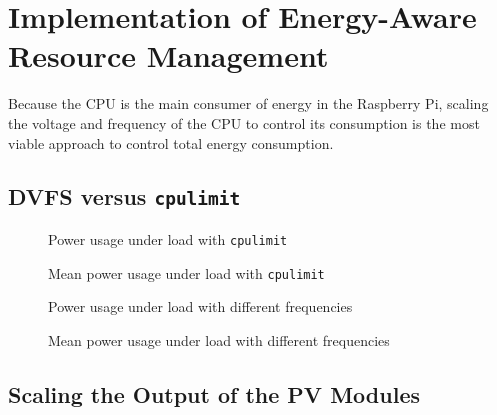 \section{Implementation of Energy-Aware Resource Management}
\label{sec:implementation_of_energy-aware_resource_management}

Because the CPU is the main consumer of energy in the Raspberry Pi, scaling the
voltage and frequency of the CPU to control its consumption is the most viable
approach to control total energy consumption.

\subsection{DVFS versus \texttt{cpulimit}}

\begin{figure}
    \centering
    
    \caption{Power usage under load with \texttt{cpulimit}}
    \label{fig:cpulimit_load}
\end{figure}

\begin{figure}
    \centering
    
    \caption{Mean power usage under load with \texttt{cpulimit}}
    \label{fig:cpulimit_mean}
\end{figure}

\begin{figure}
    \centering
    
    \caption{Power usage under load with different frequencies}
    \label{fig:freq_load}
\end{figure}

\begin{figure}
    \centering
    
    \caption{Mean power usage under load with different frequencies}
    \label{fig:freq_mean}
\end{figure}


\subsection{Scaling the Output of the PV Modules}

